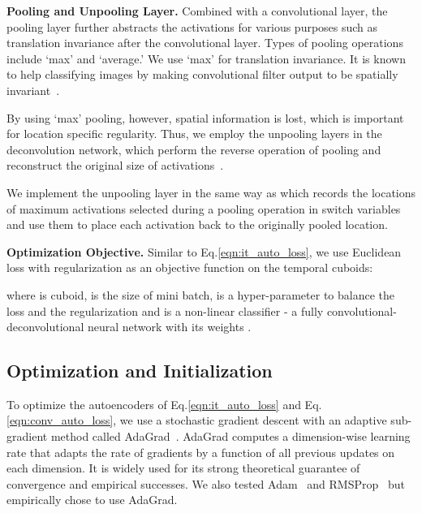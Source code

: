 \documentclass[10pt,twocolumn,letterpaper]{article}
\begin{document}
\vspace{.5em}
\noindent \textbf{Pooling and Unpooling Layer.}
Combined with a convolutional layer, the pooling layer further abstracts the activations for various purposes such as translation invariance after the convolutional layer.
Types of pooling operations include `max' and `average.'
We use `max' for translation invariance.
It is known to help classifying images by making convolutional filter output to be spatially invariant~\cite{krizhevsky2012imagenet}.

By using `max' pooling, however, spatial information is lost, which is important for location specific regularity.
Thus, we employ the unpooling layers in the deconvolution network, which perform the reverse operation of pooling and reconstruct the original size of activations~\cite{nohHH15,zeiler2014visualizing,zeiler2011adaptive}. 

We implement the unpooling layer in the same way as \cite{zeiler2014visualizing,zeiler2011adaptive} which records the locations of maximum activations selected during a pooling operation in switch variables and use them to place each activation back to the originally pooled location.


\vspace{.5em}
\noindent \textbf{Optimization Objective.}
Similar to Eq.\ref{eqn:it_auto_loss}, we use Euclidean loss with  regularization as an objective function on the temporal cuboids:

where  is  cuboid,  is the size of mini batch,  is a hyper-parameter to balance the loss and the regularization and  is a non-linear classifier - a fully convolutional-deconvolutional neural network with its weights .



\subsection{Optimization and Initialization}
To optimize the autoencoders of Eq.\ref{eqn:it_auto_loss} and Eq.\ref{eqn:conv_auto_loss}, we use a stochastic gradient descent with an adaptive sub-gradient method called AdaGrad~\cite{duchi2011adaptive}.
AdaGrad computes a dimension-wise learning rate that adapts the rate of gradients by a function of all previous updates on each dimension.
It is widely used for its strong theoretical guarantee of convergence and empirical successes.
We also tested Adam~\cite{kingmaB15} and RMSProp~\cite{tielemanH12} but empirically chose to use AdaGrad.
\end{document}
